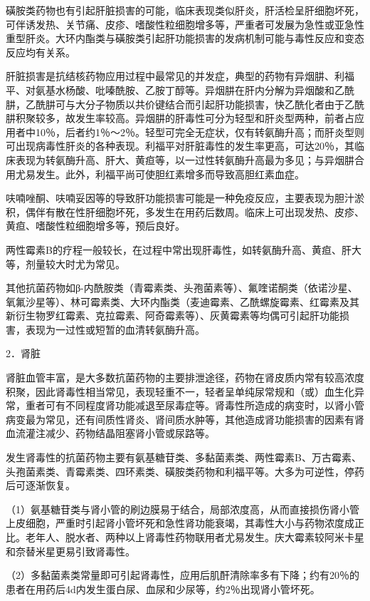 磺胺类药物也有引起肝脏损害的可能，临床表现类似肝炎，肝活检呈肝细胞坏死，可伴诱发热、关节痛、皮疹、嗜酸性粒细胞增多等，严重者可发展为急性或亚急性重型肝炎。大环内酯类与磺胺类引起肝功能损害的发病机制可能与毒性反应和变态反应均有关系。

肝脏损害是抗结核药物应用过程中最常见的并发症，典型的药物有异烟肼、利福平、对氨基水杨酸、吡嗪酰胺、乙胺丁醇等。异烟肼在肝内分解为异烟酸和乙酰肼，乙酰肼可与大分子物质以共价键结合而引起肝功能损害，快乙酰化者由于乙酰肼积聚较多，故发生率较高。异烟肼的肝毒性可分为轻型和肝炎型两种，前者占应用者中10％，后者约1％～2％。轻型可完全无症状，仅有转氨酶升高；而肝炎型则可出现病毒性肝炎的各种表现。利福平对肝脏毒性的发生率更高，可达20％，其临床表现为转氨酶升高、肝大、黄疸等，以一过性转氨酶升高最为多见；与异烟肼合用尤易发生。此外，利福平尚可使胆红素增多而导致高胆红素血症。

呋喃唑酮、呋喃妥因等的导致肝功能损害可能是一种免疫反应，主要表现为胆汁淤积，偶伴有散在性肝细胞坏死，多发生在用药后数周。临床上可出现发热、皮疹、黄疸、嗜酸性粒细胞增多等，预后良好。

两性霉素B的疗程一般较长，在过程中常出现肝毒性，如转氨酶升高、黄疸、肝大等，剂量较大时尤为常见。

其他抗菌药物如β-内酰胺类（青霉素类、头孢菌素等）、氟喹诺酮类（依诺沙星、氧氟沙星等）、林可霉素类、大环内酯类（麦迪霉素、乙酰螺旋霉素、红霉素及其新衍生物罗红霉素、克拉霉素、阿奇霉素等）、灰黄霉素等均偶可引起肝功能损害，表现为一过性或短暂的血清转氨酶升高。

2．肾脏

肾脏血管丰富，是大多数抗菌药物的主要排泄途径，药物在肾皮质内常有较高浓度积聚，因此肾毒性相当常见，表现轻重不一，轻者呈单纯尿常规和（或）血生化异常，重者可有不同程度肾功能减退至尿毒症等。肾毒性所造成的病变时，以肾小管病变最为常见，还有间质性肾炎、肾间质水肿等，其他造成肾功能损害的因素有肾血流灌注减少、药物结晶阻塞肾小管或尿路等。

发生肾毒性的抗菌药物主要有氨基糖苷类、多黏菌素类、两性霉素B、万古霉素、头孢菌素类、青霉素类、四环素类、磺胺类药物和利福平等。大多为可逆性，停药后可逐渐恢复。

（1）氨基糖苷类与肾小管的刷边膜易于结合，局部浓度高，从而直接损伤肾小管上皮细胞，严重时引起肾小管坏死和急性肾功能衰竭，其毒性大小与药物浓度成正比。老年人、脱水者、两种以上肾毒性药物联用者尤易发生。庆大霉素较阿米卡星和奈替米星更易引致肾毒性。

（2）多黏菌素类常量即可引起肾毒性，应用后肌酐清除率多有下降；约有20％的患者在用药后4d内发生蛋白尿、血尿和少尿等，约2％出现肾小管坏死。

